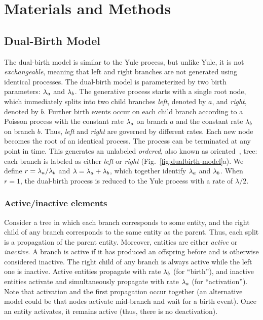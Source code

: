 \section{Materials and Methods}
\subsection{Dual-Birth Model}
The dual-birth model is similar to the Yule process, but unlike Yule, it is not \textit{exchangeable}, meaning that left and right branches are not generated using identical processes. The dual-birth model is parameterized by two birth parameters: $\lambda_a$ and $\lambda_b$. The generative process starts with a single root node, which immediately splits into two child branches \textit{left}, denoted by $a$,  and \textit{right}, denoted by $b$. Further birth events occur on each child branch according to a Poisson process with the constant rate $\lambda_a$ on branch $a$ and the constant rate $\lambda_b$ on branch $b$. Thus, \textit{left} and \textit{right} are governed by different rates. Each new node becomes the root of an identical process. The process can be terminated at any point in time. This generates an unlabeled \textit{ordered}, also known as oriented~\cite{Lambert2013}, tree: each branch is labeled as either \textit{left} or \textit{right} (Fig.~\ref{fig:dualbirth-model}a). We define $r=\lambda_a/\lambda_b$ and $\lambda=\lambda_a+\lambda_b$, which together identify $\lambda_a$ and $\lambda_b$. When $r=1$, the dual-birth process is reduced to the Yule process
with a rate of $\lambda/2$.

\subsubsection{Active/inactive elements}
Consider a tree in which each branch corresponds to some entity, and the right child of any branch corresponds to the same entity as the parent. Thus, each split is a propagation of the parent entity. Moreover, entities are either \textit{active} or \textit{inactive}. A branch is active if it has produced an offspring before and is otherwise considered inactive. The right child of any branch is always active while the left one is  inactive. Active entities  propagate with rate $\lambda_b$ (for ``birth''), and inactive entities activate and simultaneously propagate with rate $\lambda_a$ (for ``activation''). Note that activation and the first propagation occur together (an alternative model could be that nodes activate mid-branch and wait for a birth event). Once an entity activates, it remains active (thus, there is no deactivation).

